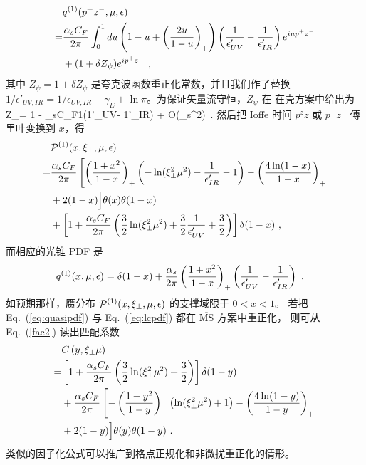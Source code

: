 \begin{align}
&q^{(1)}(p^+z^-,\mu,\epsilon)\nonumber\\
=&{\alpha_sC_F\over 2\pi}\int_0^1 du \left(1-u+\left({2u\over 1-u}\right)_+\right)\left({1\over \epsilon'_{UV}}- {1\over \epsilon'_{IR}}\right)e^{iu p^+ z^-}\nonumber\\
& + (1+\delta Z_\psi)e^{i p^+ z^-} \ ,
\end{align}
其中 $Z_\psi = 1+ \delta Z_\psi$ 是夸克波函数重正化常数，并且我们作了替换
$1/\epsilon'_{UV,IR} = 1/\epsilon_{UV,IR}+\gamma_E+\ln\pi$。为保证矢量流守恒，$Z_\psi$ 在
在壳方案中给出为
\beq
Z_\psi = 1 - {\alpha_sC_F\pi}{1}\left({1\over \epsilon'_{UV}}- {1\over \epsilon'_{IR}}\right) + O(\alpha_s^2)\ .
\eeq
然后把 Ioffe 时间 $p^z z$ 或 $p^+z^-$ 傅里叶变换到 $x$，得
\begin{align} \label{eq:quasipdf}
&{\cal P}^{(1)}(x,\xi_\perp,\mu,\epsilon)\nonumber\\
=&{\alpha_sC_F\over 2\pi}\left[\left({1+x^2\over 1-x}\right)_+\left(-\ln(\xi_\perp^2 \mu^2) - {1\over \epsilon'_{IR}}-1\right)  - \left(4\ln(1-x)\over 1-x\right)_+  \right.\nonumber\\
&+2(1-x)\Big]\theta(x)\theta(1-x)\nonumber\\
&  +\left[ 1+ {\alpha_sC_F\over 2\pi}\left({3\over2}\ln(\xi_\perp^2\mu^2) + {3\over2}{1\over \epsilon'_{UV}}+{3\over2}\right)\right]\delta(1-x) \ ,
\end{align}
而相应的光锥 PDF 是
\begin{align} \label{eq:lcpdf}
q^{(1)}(x,\mu,\epsilon) &= \delta(1-x) + {\alpha_s\over 2\pi}\left({1+x^2\over 1-x}\right)_+\left({1\over\epsilon'_{UV}} - {1\over \epsilon'_{IR}}\right)\ .
\end{align}
如预期那样，赝分布 ${\cal P}^{(1)}(x,\xi_\perp,\mu,\epsilon)$ 的支撑域限于 $0<x<1$。
若把 Eq.~(\ref{eq:quasipdf}) 与 Eq.~(\ref{eq:lcpdf}) 都在 $\overline{\text{MS}}$ 方案中重正化，
则可从 Eq.~(\ref{fac2}) 读出匹配系数
\begin{align}
&C\left(y,\xi_\perp\mu\right)\nonumber\\
=& \left[1+{\alpha_sC_F\over 2\pi}\left({3\over2}\ln(\xi_\perp^2\mu^2)+{3\over2}\right)\right] \delta(1-y)\nonumber\\
& + {\alpha_sC_F\over 2\pi} \left[-\left({1+y^2\over 1-y}\right)_+\left(\ln(\xi_\perp^2 \mu^2) +1 \right)- \left(4\ln(1-y)\over 1-y\right)_+ \right.\nonumber\\
&+2(1-y)\Big]\theta(y)\theta(1-y)\ .
\end{align}
\noindent 类似的因子化公式可以推广到格点正规化和非微扰重正化的情形。

